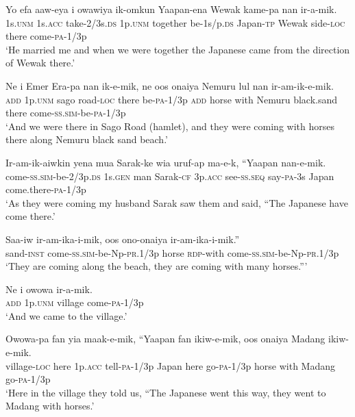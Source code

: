 \ea
\gll  Yo  efa  aaw-eya  i  owawiya  ik-omkun   Yaapan-ena  Wewak  kame-pa  nan  ir-a-mik. \\
1s.\textsc{unm}  1s.\textsc{acc}  take-2/3s.\textsc{ds}  1p.\textsc{unm}  together  be-1s/p.\textsc{ds}  Japan-\textsc{tp}  Wewak  side-\textsc{loc}  there  come-\textsc{pa}-1/3p \\
\glt ‘He married me and when we were together the Japanese came from the direction of Wewak there.’ \\
\z


\ea
\gll  Ne  i  Emer  Era-pa  nan  ik-e-mik,  ne  oos   onaiya  Nemuru  lul  nan  ir-am-ik-e-mik. \\
\textsc{add}  1p.\textsc{unm}  sago  road-\textsc{loc}  there  be-\textsc{pa}-1/3p  \textsc{add}  horse with  Nemuru  black.sand  there  come-\textsc{ss}.\textsc{sim}-be-\textsc{pa}-1/3p \\
\glt ‘And we were there in Sago Road (hamlet), and they were coming with horses there along Nemuru black sand beach.’ \\
\z


\ea
\gll  Ir-am-ik-aiwkin  yena  mua  Sarak-ke  wia  uruf-ap  ma-e-k,  “Yaapan  nan-e-mik. \\
come-\textsc{ss}.\textsc{sim}-be-2/3p.\textsc{ds}  1s.\textsc{gen}  man  Sarak-\textsc{cf}  3p.\textsc{acc}   see-\textsc{ss.seq}  say-\textsc{pa}-3s  Japan  come.there-\textsc{pa}-1/3p \\
\glt ‘As they were coming my husband Sarak saw them and said, “The Japanese have come there.’ \\
\z


\ea
\gll  Saa-iw  ir-am-ika-i-mik,  oos  ono-onaiya       ir-am-ika-i-mik.” \\
sand-\textsc{inst}  come-\textsc{ss}.\textsc{sim}-be-Np-\textsc{pr}.1/3p  horse  \textsc{rdp}-with come-\textsc{ss}.\textsc{sim}-be-Np-\textsc{pr}.1/3p \\
\glt ‘They are coming along the beach, they are coming with many horses.”’ \\
\z


\ea
\gll  Ne  i  owowa  ir-a-mik. \\
\textsc{add}  1p.\textsc{unm}  village  come-\textsc{pa}-1/3p \\
\glt ‘And we came to the village.’ \\
\z


\ea
\gll  Owowa-pa  fan  yia  maak-e-mik,  “Yaapan  fan  ikiw-e-mik,       oos  onaiya  Madang  ikiw-e-mik. \\
village-\textsc{loc}  here  1p.\textsc{acc}  tell-\textsc{pa}-1/3p  Japan  here  go-\textsc{pa}-1/3p horse  with  Madang  go-\textsc{pa}-1/3p \\
\glt ‘Here in the village they told us, “The Japanese went this way, they went to Madang with horses.’ \\
\z


